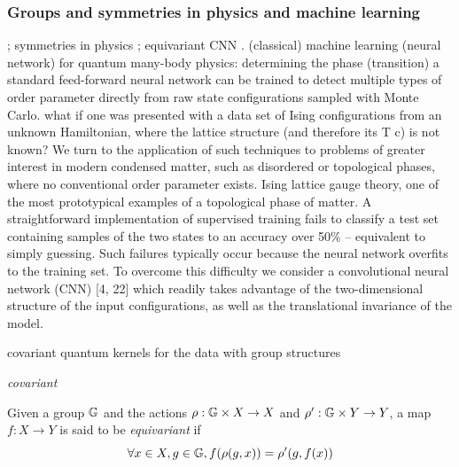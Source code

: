 \subsubsection{Groups and symmetries in physics and machine learning}
\cite{kondorGroupTheoreticalMethods2008};
symmetries in physics
\cite{bogatskiyLorentzGroupEquivariant2020}
\cite{bogatskiySymmetryGroupEquivariant2022};
equivariant CNN 
\cite{zhengSpeedingLearningQuantum2022}.
(classical) machine learning (neural network) for quantum many-body physics:
determining the phase (transition) 
a standard feed-forward neural network can be trained to detect multiple types of order parameter directly from raw state conﬁgurations sampled with Monte Carlo.
what if one was presented with a data set of Ising conﬁgurations from an unknown Hamiltonian, where the lattice structure (and therefore its T c) is not known?
We turn to the application of such techniques to problems of greater interest in modern condensed matter, such as disordered or topological phases, where no conventional order parameter exists.
Ising lattice gauge theory, one of the most prototypical examples of a topological phase of matter.
A straightforward implementation of supervised training fails to classify a test set containing samples of the two states to an accuracy over 50\% – equivalent to simply guessing. Such failures typically occur because the neural network overﬁts to the training set. To overcome this diﬃculty we consider a convolutional neural network (CNN) [4, 22] which readily takes advantage of the two-dimensional structure of the input conﬁgurations, as well as the translational invariance of the model.
\cite{carrasquillaMachineLearningPhases2017}
\cite{carleoSolvingQuantumManyBody2017}

covariant quantum kernels for the data with group structures
\cite{glickCovariantQuantumKernels2021}
\begin{definition}[Covariant]\label{def:covariant}
	\emph{covariant}
\end{definition}
\begin{definition}[Equivariance]\label{def:equivariant}
	Given a group $\mathbb{G}$ and the actions $\rho: \mathbb{G} \times X\to X$ and $\rho': \mathbb{G} \times Y\to Y$,
	a map $f: X\to Y$ is said to be \emph{equivariant} if
	\begin{equation}
		\forall x\in X, g\in \mathbb{G},
		f(\rho(g,x)) = \rho'(g,f(x))
	\end{equation}
\end{definition}

